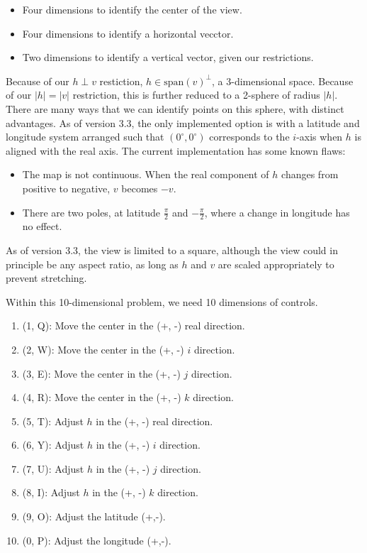 \documentclass[a4paper]{article}
\begin{document}
\begin{itemize}
    \item Four dimensions to identify the center of the view.
    \item Four dimensions to identify a horizontal vecctor.
    \item Two dimensions to identify a vertical vector, given our restrictions.
\end{itemize}

Because of our $h \perp v$ restiction, $h \in \text{span}(v)^\perp$, a 3-dimensional space.  Because of our $|h| = |v|$ restriction, this is further reduced to a 2-sphere of radius $|h|$.  There are many ways that we can identify points on this sphere, with distinct advantages.  As of version 3.3, the only implemented option is with a latitude and longitude system arranged such that $(0^\circ, 0^\circ)$ corresponds to the $i$-axis when $h$ is aligned with the real axis. The current implementation has some known flaws:

\begin{itemize}
    \item The map is not continuous.  When the real component of $h$ changes from positive to negative, $v$ becomes $-v$.   
    \item There are two poles, at latitude $\frac{\pi}{2}$ and $-\frac{\pi}{2}$, where a change in longitude has no effect.
\end{itemize}

As of version 3.3, the view is limited to a square, although the view could in principle be any aspect ratio, as long as $h$ and $v$ are scaled appropriately to prevent stretching.

Within this 10-dimensional problem, we need 10 dimensions of controls.

\begin{enumerate}
    \item (1, Q): Move the center in the (+, -) real direction.
    \item (2, W): Move the center in the (+, -) $i$ direction.
    \item (3, E): Move the center in the (+, -) $j$ direction.
    \item (4, R): Move the center in the (+, -) $k$ direction.
    \item (5, T): Adjust $h$ in the (+, -) real direction.
    \item (6, Y): Adjust $h$ in the (+, -) $i$ direction.
    \item (7, U): Adjust $h$ in the (+, -) $j$ direction.
    \item (8, I): Adjust $h$ in the (+, -) $k$ direction.
    \item (9, O): Adjust the latitude (+,-).
    \item (0, P): Adjust the longitude (+,-).
\end{enumerate}
\end{document}
